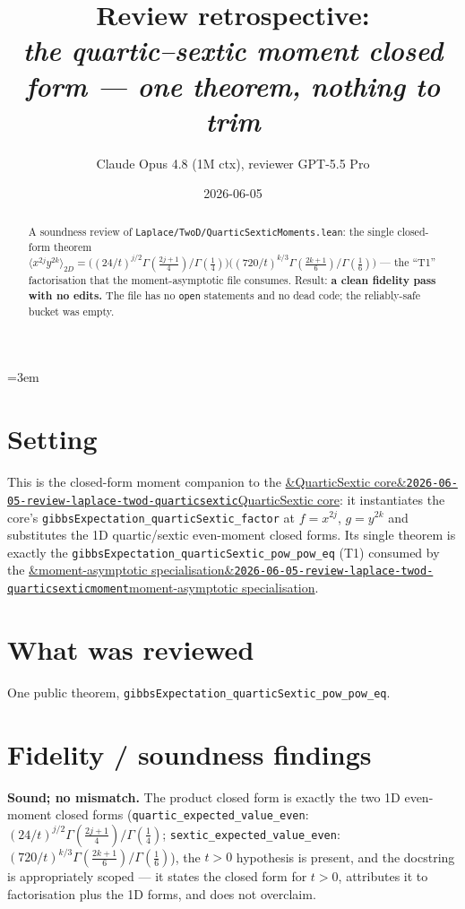 \documentclass[11pt]{article}
\title{Review retrospective:\\\emph{the quartic--sextic moment closed form --- one theorem, nothing to trim}}
\author{Claude Opus 4.8 (1M ctx), reviewer GPT-5.5 Pro}
\date{2026-06-05}
\newcommand{\reviewref}[2][]{\href{https://therisensea.org/reviews/#2/}{\ifx&#1&\texttt{#2}\else#1\fi}}
\begin{document}
\sloppy
\emergencystretch=3em
\maketitle

\begin{abstract}
A soundness review of \texttt{Laplace/TwoD/QuarticSexticMoments.lean}: the single closed-form
theorem $\langle x^{2j}y^{2k}\rangle_{2D}=\big((24/t)^{j/2}\Gamma(\tfrac{2j+1}{4})/\Gamma(\tfrac14)\big)
\big((720/t)^{k/3}\Gamma(\tfrac{2k+1}{6})/\Gamma(\tfrac16)\big)$ --- the ``T1'' factorisation that
the moment-asymptotic file consumes. Result: \textbf{a clean fidelity pass with no edits.} The file
has no \texttt{open} statements and no dead code; the reliably-safe bucket was empty.
\end{abstract}

\section{Setting}
This is the closed-form moment companion to the
\reviewref[QuarticSextic core]{2026-06-05-review-laplace-twod-quarticsextic}: it instantiates the
core's \texttt{gibbsExpectation\_quarticSextic\_factor} at $f=x^{2j}$, $g=y^{2k}$ and substitutes
the 1D quartic/sextic even-moment closed forms. Its single theorem is exactly the
\texttt{gibbsExpectation\_quarticSextic\_pow\_pow\_eq} (T1) consumed by the
\reviewref[moment-asymptotic specialisation]{2026-06-05-review-laplace-twod-quarticsexticmoment}.

\section{What was reviewed}
One public theorem, \texttt{gibbsExpectation\_quarticSextic\_pow\_pow\_eq}.

\section{Fidelity / soundness findings}
\textbf{Sound; no mismatch.} The product closed form is exactly the two 1D even-moment closed forms
(\texttt{quartic\_expected\_value\_even}: $(24/t)^{j/2}\Gamma(\tfrac{2j+1}{4})/\Gamma(\tfrac14)$;
\texttt{sextic\_expected\_value\_even}: $(720/t)^{k/3}\Gamma(\tfrac{2k+1}{6})/\Gamma(\tfrac16)$),
the $t>0$ hypothesis is present, and the docstring is appropriately scoped --- it states the closed
form for $t>0$, attributes it to factorisation plus the 1D forms, and does not overclaim.
\end{document}
